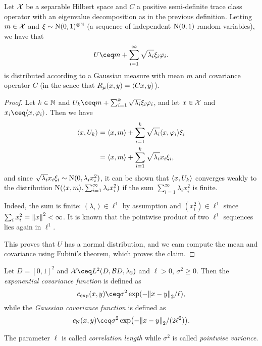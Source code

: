 \begin{proposition}
	Let $\mathcal X$ be a separable Hilbert space and $C$ a positive semi-definite trace class operator with an eigenvalue decomposition as in the previous definition. Letting $m \in \mathcal X$ and $\xi \sim \mathrm N(0, 1)^{\otimes\mathbb N}$ (a sequence of independent $\mathrm N(0,1)$ random variables), we have that
	\[
	U \ceq m + \sum_{i=1}^\infty \sqrt{\lambda_i} \xi_i \phi_i. 
	\]
	is distributed according to a Gaussian measure with mean $m$ and covariance operator $C$ (in the sence that $R_\mu(x, y) = \langle Cx, y\rangle$). 
\end{proposition}

\begin{proof}
	Let $k \in \mathbb N$ and $U_k \ceq m + \sum_{i=1}^k \sqrt{\lambda_i} \xi_i \phi_i$, and let $x \in \mathcal X$ and $x_i \ceq \ang{x, \phi_i}$. Then we have 
	\begin{align*}
		\langle x, U_k\rangle &= \langle x, m\rangle + \sum_{i=1}^k \sqrt{\lambda_i} \langle x, \varphi_i\rangle \xi_i \\
		&= \langle x, m\rangle + \sum_{i=1}^k \sqrt{\lambda_i} x_i \xi_i, 
	\end{align*}
and since $\sqrt{\lambda_i}x_i\xi_i \sim \mathrm N(0, \lambda_i x_i^2)$, it can be shown that $\langle x, U_k\rangle$ converges weakly to the distribution $\mathrm N(\langle x, m\rangle, \sum_{i=1}^\infty \lambda_i x_i^2)$ if the sum $\sum_{i=1}^\infty \lambda_ix_i^2$ is finite. 

Indeed, the sum is finite: $(\lambda_i) \in \ell^1$ by assumption and $(x_i^2) \in \ell^1$ since $\sum_i x_i^2 = \norm{x}^2 < \infty$. It is known that the pointwise product of two $\ell^1$ sequences lies again in $\ell^1$. 

This proves that $U$ has a normal distribution, and we cam compute the mean and covariance  using Fubini's theorem, which proves the claim. 
\end{proof}

\begin{example}
	Let $D = [0, 1]^2$ and $\XX \ceq L^2(D, \BB D, \lambda_2)$ and $\ell > 0$, $\sigma^2 \geq 0$. Then the \emph{exponential covariance function} is defined as
	\[
	c_\Rm{exp}(x, y) \ceq \sigma^2\exp(-\norm{x - y}_2 / \ell),
	\]
	while the \emph{Gaussian covariance function} is defined as
	\[
	c_\Rm{N}(x, y) \ceq \sigma^2 \exp(- \norm{x - y}_2 / (2\ell^2)). 
	\]
	
	The parameter $\ell$ is called \emph{correlation length} while $\sigma^2$ is called \emph{pointwise variance}. 
\end{example}


